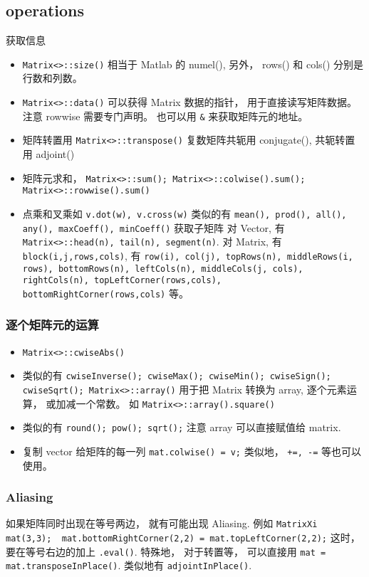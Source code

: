 \subsection{operations}
获取信息
\begin{itemize}
\item \verb|Matrix<>::size()| 相当于 Matlab 的 numel(), 另外， rows() 和 cols() 分别是行数和列数。
\item \verb|Matrix<>::data()| 可以获得 Matrix 数据的指针， 用于直接读写矩阵数据。 注意 rowwise 需要专门声明。 也可以用 \verb|&| 来获取矩阵元的地址。
\item 矩阵转置用 \verb|Matrix<>::transpose()| 复数矩阵共轭用 conjugate(), 共轭转置用 adjoint()
\item 矩阵元求和， \verb|Matrix<>::sum(); Matrix<>::colwise().sum(); Matrix<>::rowwise().sum()|
\item 点乘和叉乘如 \verb|v.dot(w), v.cross(w)|
类似的有 \verb|mean(), prod(), all(), any(), maxCoeff(), minCoeff()|
获取子矩阵
对 Vector, 有 \verb|Matrix<>::head(n), tail(n), segment(n)|. 对 Matrix, 有 \verb|block(i,j,rows,cols)|, 有 \verb|row(i), col(j), topRows(n), middleRows(i, rows), bottomRows(n), leftCols(n), middleCols(j, cols), rightCols(n), topLeftCorner(rows,cols), bottomRightCorner(rows,cols)| 等。
\end{itemize}


\subsubsection{逐个矩阵元的运算}
\begin{itemize}
\item \verb|Matrix<>::cwiseAbs()|
\item 类似的有 \verb|cwiseInverse(); cwiseMax(); cwiseMin(); cwiseSign(); cwiseSqrt(); Matrix<>::array()| 用于把 Matrix 转换为 array, 逐个元素运算， 或加减一个常数。 如 \verb|Matrix<>::array().square()|
\item 类似的有 \verb|round(); pow(); sqrt();| 注意 array 可以直接赋值给 matrix.
\item 复制 vector 给矩阵的每一列 \verb|mat.colwise() = v;| 类似地， \verb|+=, -=| 等也可以使用。
\end{itemize}


\subsubsection{Aliasing}
如果矩阵同时出现在等号两边， 就有可能出现 Aliasing. 例如 \verb|MatrixXi mat(3,3);  mat.bottomRightCorner(2,2) = mat.topLeftCorner(2,2);| 这时， 要在等号右边的加上 \verb|.eval()|. 特殊地， 对于转置等， 可以直接用 \verb|mat = mat.transposeInPlace()|. 类似地有 \verb|adjointInPlace()|.

